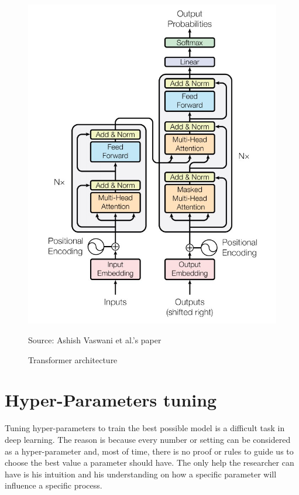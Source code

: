 \documentclass[12pt]{report}
\begin{document}
\begin{figure}[htbp]
    \centering
    \includegraphics[width=\textwidth]{images/related_works/transformer/transformer_architecture.jpg}
    \caption{Transformer architecture}
    Source: Ashish Vaswani et al.'s paper \cite{vaswani_attention_2017-1}
    \label{fig:arch:transformer}
\end{figure}

\section{Hyper-Parameters tuning}

Tuning hyper-parameters to train the best possible model is a difficult task in deep learning.
The reason is because every number or setting can be considered as a hyper-parameter and, most of time, there is no proof or rules to guide us to choose the best value a parameter should have.
The only help the researcher can have is his intuition and his understanding on how a specific parameter will influence a specific process.
\end{document}

